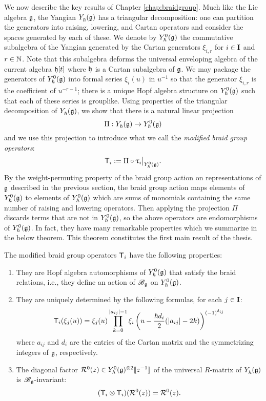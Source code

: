 We now describe the key results of Chapter \ref{chap:braidgroup}.
Much like the Lie algebra $\g$, the Yangian $\Yhg$ has a triangular decomposition: one can partition the generators into raising, lowering, and Cartan operators and consider the spaces generated by each of these.
We denote by $\Yhg[0]$ the commutative subalgebra of the Yangian generated by the Cartan generators $\xi_{i,r}$ for $i\in\I$ and $r\in\N$.
Note that this subalgebra deforms the universal enveloping algebra of the current algebra $\h[t]$ where $\h$ is a Cartan subalgebra of $\g$.
We may package the generators of $\Yhg[0]$ into formal series $\xi_i(u)$ in $u^{-1}$ so that the generator $\xi_{i,r}$ is the coefficient of $u^{-r-1}$; there is a unique Hopf algebra structure on $\Yhg[0]$ such that each of these series is grouplike.
Using properties of the triangular decomposition of $\Yhg$, we show that there is a natural linear projection
\[\Pi:\Yhg\to\Yhg[0]\]
and we use this projection to introduce what we call the \emph{modified braid group operators}:
\[\mbraid_i := \Pi\circ\braid_i\big|_{\Yhg[0]}.\]
By the weight-permuting property of the braid group action on representations of $\g$ described in the previous section, the braid group action maps elements of $\Yhg[0]$ to elements of $\Yhg[0]$ which are sums of monomials containing the same number of raising and lowering operators.
Then applying the projection $\Pi$ discards terms that are not in $\Yhg[0]$, so the above operators are endomorphisms of $\Yhg[0]$.
In fact, they have many remarkable properties which we summarize in the below theorem.
This theorem constitutes the first main result of the thesis.

\begin{theorem}\label{T:intro-main1}
    The modified braid group operators $\mbraid_i$ have the following properties:
    \begin{enumerate}
        \item They are Hopf algebra automorphisms of $\Yhg[0]$ that satisfy the braid relations, i.e., they define an action of $\Bg$ on $\Yhg[0]$.
        \item They are uniquely determined by the following formulas, for each $j\in\I$:
        \[\mbraid_i(\xi_j(u)) = \xi_j(u)\prod_{k=0}^{\abs{a_{ij}}-1} \xi_i\left(u-\frac{\hbar d_i}{2}(\abs{a_{ij}}-2k)\right)^{(-1)^{\delta_{ij}}}\]
        where $a_{ij}$ and $d_i$ are the entries of the Cartan matrix and the symmetrizing integers of $\g$, respectively.
        \item The diagonal factor $\rmat^0(z)\in \Yhg[0]^{\otimes 2}\db{z^{-1}}$ of the universal $R$-matrix of $\Yhg$ is $\Bg$-invariant:
        \[(\mbraid_i\otimes\mbraid_i)(\rmat^0(z)) = \rmat^0(z).\]
    \end{enumerate}
\end{theorem}

